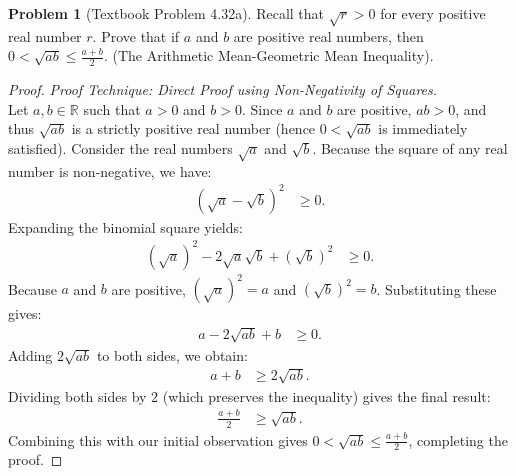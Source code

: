 \documentclass[11pt]{article}
\theoremstyle{definition}
\newtheorem{problem}{Problem}
\theoremstyle{remark}
\begin{document}
\begin{itemize}
\begin{problem}[Textbook Problem 4.32a]
Recall that $\sqrt{r} > 0$ for every positive real number $r$. Prove that if $a$ and $b$ are positive real numbers, then $0 < \sqrt{ab} \le \frac{a+b}{2}$. (The Arithmetic Mean-Geometric Mean Inequality).
\end{problem}
\begin{proof}
\textit{Proof Technique: Direct Proof using Non-Negativity of Squares.} \\
Let $a, b \in \mathbb{R}$ such that $a > 0$ and $b > 0$. Since $a$ and $b$ are positive, $ab > 0$, and thus $\sqrt{ab}$ is a strictly positive real number (hence $0 < \sqrt{ab}$ is immediately satisfied). 
Consider the real numbers $\sqrt{a}$ and $\sqrt{b}$. Because the square of any real number is non-negative, we have:
\begin{align*}
    (\sqrt{a} - \sqrt{b})^2 &\ge 0.
\end{align*}
Expanding the binomial square yields:
\begin{align*}
    (\sqrt{a})^2 - 2\sqrt{a}\sqrt{b} + (\sqrt{b})^2 &\ge 0.
\end{align*}
Because $a$ and $b$ are positive, $(\sqrt{a})^2 = a$ and $(\sqrt{b})^2 = b$. Substituting these gives:
\begin{align*}
    a - 2\sqrt{ab} + b &\ge 0.
\end{align*}
Adding $2\sqrt{ab}$ to both sides, we obtain:
\begin{align*}
    a + b &\ge 2\sqrt{ab}.
\end{align*}
Dividing both sides by $2$ (which preserves the inequality) gives the final result:
\begin{align*}
    \frac{a + b}{2} &\ge \sqrt{ab}.
\end{align*}
Combining this with our initial observation gives $0 < \sqrt{ab} \le \frac{a+b}{2}$, completing the proof.
\end{proof}


\end{itemize}
\end{document}
